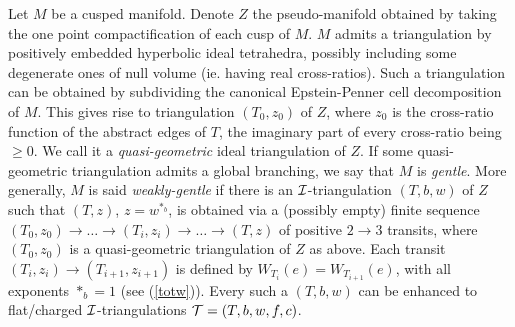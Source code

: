 Let $M$ be a cusped manifold. Denote $Z$ the pseudo-manifold obtained
by taking the one point compactification of each cusp of $M$. $M$
admits a triangulation by positively embedded hyperbolic ideal
tetrahedra, possibly including some degenerate ones of null volume
(ie. having real cross-ratios). Such a triangulation can be obtained
by subdividing the canonical Epstein-Penner cell decomposition of
$M$. This gives rise to triangulation $(T_0,z_0)$ of $Z$, where $z_0$ is
the cross-ratio function of the abstract edges of $T$, the imaginary
part of every cross-ratio being $\geq 0$. We call it a {\it
  quasi-geometric} ideal triangulation of $Z$. If some quasi-geometric
triangulation admits a global branching, we say that $M$ is {\it
  gentle}. More generally, $M$ is said {\it weakly-gentle} if there is
an ${\mathcal I}$-triangulation $(T,b,w)$ of $Z$ such that $(T,z)$,
$z=w^{*_b}$, is obtained via a (possibly empty) finite sequence
$(T_0,z_0) \rightarrow \ldots \rightarrow (T_i,z_i) \rightarrow \ldots
\rightarrow (T,z)$ of positive $2 \rightarrow 3$ transits, where
$(T_0,z_0)$ is a quasi-geometric triangulation of $Z$ as above. Each
transit $(T_i,z_i) \rightarrow (T_{i+1},z_{i+1})$ is defined by
$W_{T_i}(e)=W_{T_{i+1}}(e)$, with all exponents $*_b=1$ (see
(\ref{totw})). Every such a $(T,b,w)$ can be enhanced to flat/charged
${\mathcal I}$-triangulations ${\mathcal T}=(T,b,w,f,c)$.
\smallskip

